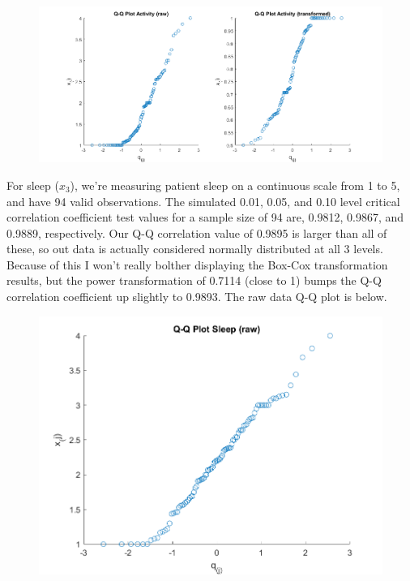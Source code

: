 \begin{center}
    \begin{figure}[H]
        \centering
        \includegraphics[scale=0.4]{./matlab/chapter-4/sol4.32.qq.2.png}
    \end{figure}
\end{center}

For sleep ($x_{3}$), we're measuring patient sleep on a continuous scale from 1 to 5, and have 94 valid observations. The simulated 0.01, 0.05, and 0.10 level critical correlation coefficient test values for a sample size of 94 are, 0.9812, 0.9867, and 0.9889, respectively. Our Q-Q correlation value of 0.9895 is larger than all of these, so out data is actually considered normally distributed at all 3 levels. Because of this I won't really bolther displaying the Box-Cox transformation results, but the power transformation of 0.7114 (close to 1) bumps the Q-Q correlation coefficient up slightly to 0.9893. The raw data Q-Q plot is below.

\begin{center}
    \begin{figure}[H]
        \centering
        \includegraphics[scale=0.6]{./matlab/chapter-4/sol4.32.qq.3.png}
    \end{figure}
\end{center}

